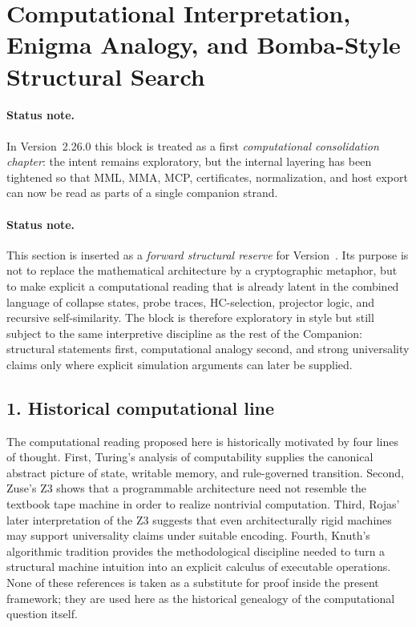 \section{Computational Interpretation, Enigma Analogy, and Bomba-Style Structural Search}
\label{sec:computational-reading}

\paragraph{Status note.}
In Version~2.26.0 this block is treated as a first \emph{computational consolidation chapter}: the intent remains exploratory, but the internal layering has been tightened so that MML, MMA, MCP, certificates, normalization, and host export can now be read as parts of a single companion strand.

\paragraph{Status note.}
This section is inserted as a \emph{forward structural reserve} for Version~\docversion. Its purpose is not to replace the mathematical architecture by a cryptographic metaphor, but to make explicit a computational reading that is already latent in the combined language of collapse states, probe traces, HC-selection, projector logic, and recursive self-similarity. The block is therefore exploratory in style but still subject to the same interpretive discipline as the rest of the Companion: structural statements first, computational analogy second, and strong universality claims only where explicit simulation arguments can later be supplied.

\subsection*{1. Historical computational line}
The computational reading proposed here is historically motivated by four lines of thought. First, Turing's analysis of computability supplies the canonical abstract picture of state, writable memory, and rule-governed transition. Second, Zuse's Z3 shows that a programmable architecture need not resemble the textbook tape machine in order to realize nontrivial computation. Third, Rojas' later interpretation of the Z3 suggests that even architecturally rigid machines may support universality claims under suitable encoding. Fourth, Knuth's algorithmic tradition provides the methodological discipline needed to turn a structural machine intuition into an explicit calculus of executable operations. None of these references is taken as a substitute for proof inside the present framework; they are used here as the historical genealogy of the computational question itself.

